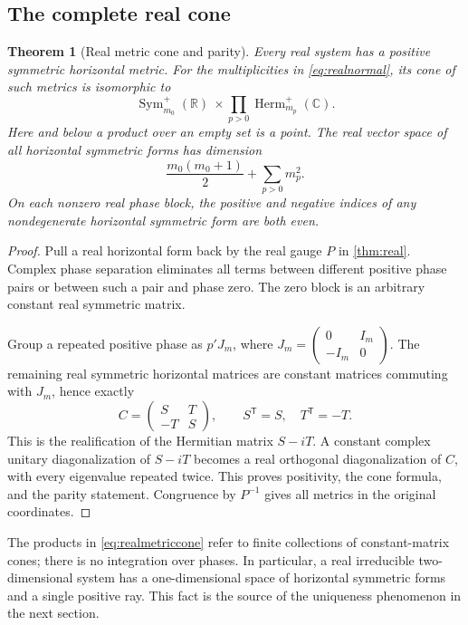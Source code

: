 \documentclass[11pt,a4paper]{article}
\numberwithin{equation}{section}
\newtheorem{theorem}{Theorem}[section]
\theoremstyle{definition}
\theoremstyle{remark}
\newcommand{\R}{\mathbb R}
\newcommand{\C}{\mathbb C}
\newcommand{\Herm}{\operatorname{Herm}}
\newcommand{\Sym}{\operatorname{Sym}}
\begin{document}
\subsection{The complete real cone}
\begin{theorem}[Real metric cone and parity]\label{thm:realmetrics}
Every real system has a positive symmetric horizontal metric. For the
multiplicities in \eqref{eq:realnormal}, its cone of such metrics is
isomorphic to
\begin{equation}\label{eq:realmetriccone}
 \Sym_{m_0}^{+}(\R)\ \times\!\prod_{p>0}\Herm_{m_p}^{+}(\C).
\end{equation}
Here and below a product over an empty set is a point. The real vector
space of all horizontal symmetric forms has dimension
\[
 \frac{m_0(m_0+1)}2+\sum_{p>0}m_p^2.
\]
On each nonzero real phase block, the positive and negative indices of any
nondegenerate horizontal symmetric form are both even.
\end{theorem}
\begin{proof}
Pull a real horizontal form back by the real gauge $P$ in
\cref{thm:real}. Complex phase separation eliminates all terms between
different positive phase pairs or between such a pair and phase zero.
The zero block is an arbitrary constant real symmetric matrix.

Group a repeated positive phase as $p'J_m$, where
$J_m=\left(\begin{smallmatrix}0&I_m\\-I_m&0\end{smallmatrix}\right)$.
The remaining real symmetric horizontal matrices are constant matrices
commuting with $J_m$, hence exactly
\[
 C=\begin{pmatrix}S&T\\-T&S\end{pmatrix},
 \qquad S^{\mathsf T}=S,\quad T^{\mathsf T}=-T.
\]
This is the realification of the Hermitian matrix $S-iT$. A constant
complex unitary diagonalization of $S-iT$ becomes a real orthogonal
diagonalization of $C$, with every eigenvalue repeated twice. This proves
positivity, the cone formula, and the parity statement. Congruence by
$P^{-1}$ gives all metrics in the original coordinates.
\end{proof}

The products in \eqref{eq:realmetriccone} refer to finite collections of
constant-matrix cones; there is no integration over phases. In particular,
a real irreducible two-dimensional system has a one-dimensional space of
horizontal symmetric forms and a single positive ray. This fact is the
source of the uniqueness phenomenon in the next section.
\end{document}
